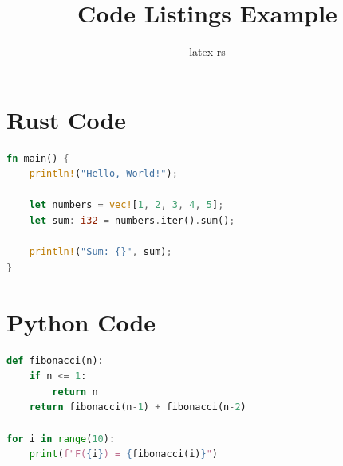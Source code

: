 \documentclass{article}
\title{Code Listings Example}
\author{latex-rs}
\begin{document}
\maketitle

\section{Rust Code}

\begin{lstlisting}[language=Rust]
fn main() {
    println!("Hello, World!");
    
    let numbers = vec![1, 2, 3, 4, 5];
    let sum: i32 = numbers.iter().sum();
    
    println!("Sum: {}", sum);
}
\end{lstlisting}

\section{Python Code}

\begin{lstlisting}[language=Python]
def fibonacci(n):
    if n <= 1:
        return n
    return fibonacci(n-1) + fibonacci(n-2)

for i in range(10):
    print(f"F({i}) = {fibonacci(i)}")
\end{lstlisting}
\end{document}
